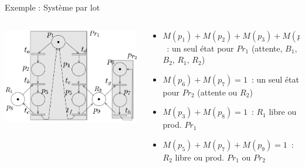 \documentclass[compress]{beamer}
\begin{document}
\begin{frame}{Exemple : Système par lot}
\begin{columns}
	\begin{column}{.4\linewidth}
	\begin{center}
		\includegraphics[width=\linewidth]{rea1}
	\end{center}
	\end{column}		
	\begin{column}{.65\linewidth}
		\begin{itemize}
		\item $M(p_1)+M(p_2)+M(p_3)+M(p_4)+M(p_5)=1$~: un seul état pour $Pr_1$ (attente, $B_1$, $B_2$, $R_1$, $R_2$)
		\item $M(p_6)+M(p_7)=1$~: un seul état pour $Pr_2$ (attente ou $R_2$)
		\item $M(p_3)+M(p_8)=1$~: $R_1$ libre ou prod. $Pr_1$
		\item $M(p_5)+M(p_7)+M(p_9)=1$~: $R_2$ libre ou prod. $Pr_1$ ou $Pr_2$
		\end{itemize} 
	\end{column}
\end{columns}
\end{frame}
 
\end{document}
